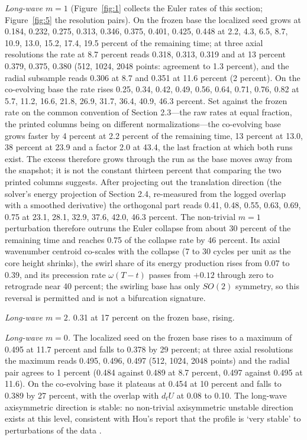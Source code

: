 \documentclass[11pt]{article}
\begin{document}
\emph{Long-wave $m = 1$} (Figure~\ref{fig:1} collects the Euler rates of this section; Figure~\ref{fig:5} the resolution pairs). On the frozen base the localized seed grows at 0.184, 0.232, 0.275, 0.313, 0.346, 0.375, 0.401, 0.425, 0.448 at 2.2, 4.3, 6.5, 8.7, 10.9, 13.0, 15.2, 17.4, 19.5 percent of the remaining time; at three axial resolutions the rate at 8.7 percent reads 0.318, 0.313, 0.319 and at 13 percent 0.379, 0.375, 0.380 (512, 1024, 2048 points: agreement to 1.3 percent), and the radial subsample reads 0.306 at 8.7 and 0.351 at 11.6 percent (2 percent). On the co-evolving base the rate rises 0.25, 0.34, 0.42, 0.49, 0.56, 0.64, 0.71, 0.76, 0.82 at 5.7, 11.2, 16.6, 21.8, 26.9, 31.7, 36.4, 40.9, 46.3 percent. Set against the frozen rate on the common convention of Section 2.3---the raw rates at equal fraction, the printed columns being on different normalizations---the co-evolving base grows faster by 4 percent at 2.2 percent of the remaining time, 13 percent at 13.0, 38 percent at 23.9 and a factor 2.0 at 43.4, the last fraction at which both runs exist. The excess therefore grows through the run as the base moves away from the snapshot; it is not the constant thirteen percent that comparing the two printed columns suggests. After projecting out the translation direction (the solver's energy projection of Section 2.4, re-measured from the logged overlap with a smoothed derivative) the orthogonal part reads 0.41, 0.48, 0.55, 0.63, 0.69, 0.75 at 23.1, 28.1, 32.9, 37.6, 42.0, 46.3 percent. The non-trivial $m = 1$ perturbation therefore outruns the Euler collapse from about 30 percent of the remaining time and reaches 0.75 of the collapse rate by 46 percent. Its axial wavenumber centroid co-scales with the collapse (7 to 30 cycles per unit as the core height shrinks), the swirl share of its energy production rises from 0.07 to 0.39, and its precession rate $\omega (T - t)$ passes from $+0.12$ through zero to retrograde near 40 percent; the swirling base has only $SO(2)$ symmetry, so this reversal is permitted and is not a bifurcation signature.

\emph{Long-wave $m = 2$.} 0.31 at 17 percent on the frozen base, rising.

\emph{Long-wave $m = 0$.} The localized seed on the frozen base rises to a maximum of 0.495 at 11.7 percent and falls to 0.378 by 29 percent; at three axial resolutions the maximum reads 0.495, 0.496, 0.497 (512, 1024, 2048 points) and the radial pair agrees to 1 percent (0.484 against 0.489 at 8.7 percent, 0.497 against 0.495 at 11.6). On the co-evolving base it plateaus at 0.454 at 10 percent and falls to 0.389 by 27 percent, with the overlap with $d_t U$ at 0.08 to 0.10. The long-wave axisymmetric direction is stable: no non-trivial axisymmetric unstable direction exists at this level, consistent with Hou's report that the profile is `very stable' to perturbations of the data \cite[Sec. 3.6]{H23b}.
\end{document}
